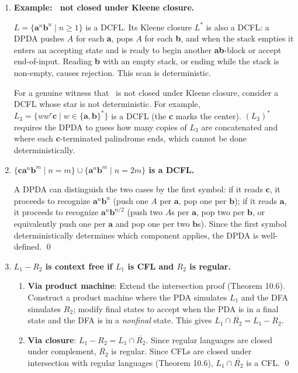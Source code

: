 \begin{enumerate}[{10.}1. ]
\item \textbf{Example: \ASIG\ not closed under Kleene closure.}

$L = \{\pmb{a}^n\pmb{b}^n \mid n\geq 1\}$ is a DCFL. Its Kleene closure $L^*$ is also a DCFL: a DPDA pushes $A$ for each \textbf{a}, pops $A$ for each \textbf{b}, and when the stack empties it enters an accepting state and is ready to begin another \textbf{a}\textbf{b}-block or accept end-of-input. Reading \textbf{b} with an empty stack, or ending while the stack is non-empty, causes rejection. This scan is deterministic.

For a genuine witness that \ASIG\ is not closed under Kleene closure, consider a DCFL whose star is not deterministic. For example, $L_3=\{ww^r\pmb{c} \mid w\in\{\pmb{a},\pmb{b}\}^*\}$ is a DCFL (the \textbf{c} marks the center). $(L_3)^*$ requires the DPDA to guess how many copies of $L_3$ are concatenated and where each \textbf{c}-terminated palindrome ends, which cannot be done deterministically.

\item \textbf{$\{\pmb{ca}^n\pmb{b}^m \mid n=m\}\cup\{\pmb{a}^n\pmb{b}^m \mid n=2m\}$ is a DCFL.}

A DPDA can distinguish the two cases by the first symbol: if it reads $\pmb{c}$, it proceeds to recognize $\pmb{a}^n\pmb{b}^n$ (push one $A$ per $\pmb{a}$, pop one per $\pmb{b}$); if it reads $\pmb{a}$, it proceeds to recognize $\pmb{a}^n\pmb{b}^{n/2}$ (push two $A$s per $\pmb{a}$, pop two per $\pmb{b}$, or equivalently push one per $\pmb{a}$ and pop one per two $\pmb{b}$s). Since the first symbol deterministically determines which component applies, the DPDA is well-defined. \qed

\item \textbf{$L_1 - R_2$ is context free if $L_1$ is CFL and $R_2$ is regular.}

\begin{enumerate}
\item \textbf{Via product machine}: Extend the intersection proof (Theorem 10.6). Construct a product machine where the PDA simulates $L_1$ and the DFA simulates $R_2$; modify final states to accept when the PDA is in a final state and the DFA is in a \emph{nonfinal} state. This gives $L_1 \cap \overline{R_2} = L_1 - R_2$.

\item \textbf{Via closure}: $L_1 - R_2 = L_1 \cap \overline{R_2}$. Since regular languages are closed under complement, $\overline{R_2}$ is regular. Since CFLs are closed under intersection with regular languages (Theorem 10.6), $L_1 \cap \overline{R_2}$ is a CFL. \qed
\end{enumerate}


\end{enumerate}
